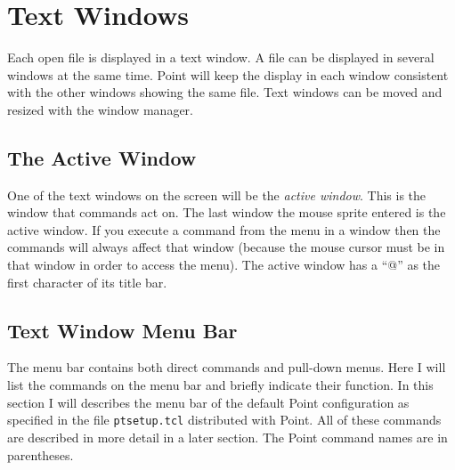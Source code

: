 \section{Text Windows} \label{sect:text}

Each open file is displayed in a text window.
A file can be displayed in several windows at the same time.
Point will keep the display in each window consistent
with the other windows showing the same file.
Text windows can be moved and resized with the window manager.

\subsection{The Active Window}

One of the text windows on the screen will be the {\em active window}.
This is the window that commands act on.
The last window the mouse sprite entered is the active window.
If you execute a command from the menu in a window then the commands
will always affect that window
(because the mouse cursor must be in that window in order to
access the menu).
The active window has a ``@'' as the first character of its
title bar.


\subsection{Text Window Menu Bar}

The menu bar contains both direct commands and pull-down menus.
Here I will list the commands on the menu bar and briefly
indicate their function.
In this section I will describes the menu bar of the default
Point configuration as specified in the file {\tt ptsetup.tcl}
distributed with Point.
All of these commands are described in more detail in a later section.
The Point command names are in parentheses.

